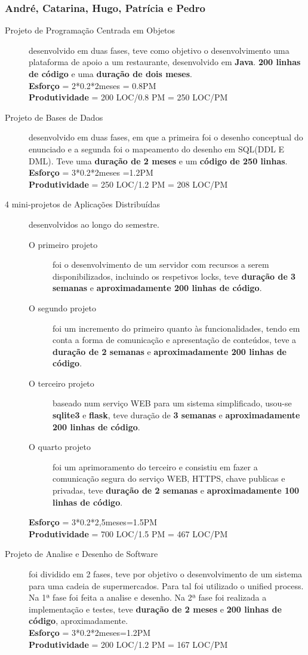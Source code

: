\documentclass[a4paper]{report}
\begin{document}
\subsubsection*{André, Catarina, Hugo, Patrícia e Pedro} 
\begin{description}
    \item[Projeto de Programação Centrada em Objetos] desenvolvido em duas fases, teve como objetivo o desenvolvimento uma plataforma de apoio a um restaurante, desenvolvido em \textbf{Java}. \textbf{200 linhas de código} e uma \textbf{duração de dois meses}.\\\textbf{Esforço} = 2*0.2*2meses = 0.8PM\\ \textbf{Produtividade} = 200 LOC/0.8 PM = 250 LOC/PM
    
    \item[Projeto de Bases de Dados] desenvolvido em duas fases, em que a primeira foi o desenho conceptual do enunciado e a segunda foi o mapeamento do desenho em SQL(DDL E DML). Teve uma \textbf{duração de 2 meses} e um \textbf{código de 250 linhas}.\\\textbf{Esforço} = 3*0.2*2meses =1.2PM\\ \textbf{Produtividade} = 250 LOC/1.2 PM = 208 LOC/PM
    \item[4 mini-projetos de Aplicações Distribuídas] desenvolvidos ao longo do semestre.
    \begin{description}
    	\item[O primeiro projeto] foi o desenvolvimento de um servidor com recursos a serem disponibilizados, incluindo os respetivos locks, teve  \textbf{duração de 3 semanas} e \textbf{aproximadamente 200 linhas de código}.
    	\item[O segundo projeto] foi um incremento do primeiro quanto às funcionalidades, tendo em conta a forma de comunicação e apresentação de conteúdos, teve a \textbf{duração de 2 semanas} e \textbf{aproximadamente 200 linhas de código}.
    	\item[O terceiro projeto] baseado num serviço WEB para um sistema simplificado, usou-se \textbf{sqlite3} e \textbf{flask}, teve duração de \textbf{3 semanas} e \textbf{aproximadamente 200 linhas de código}.
    	\item[O quarto projeto] foi um aprimoramento do terceiro e consistiu em fazer a comunicação segura do serviço WEB, HTTPS, chave publicas e privadas, teve \textbf{duração de 2 semanas} e \textbf{aproximadamente 100 linhas de código}.
    \end{description}\mbox{}\textbf{Esforço} = 3*0.2*2,5meses=1.5PM\\ \textbf{Produtividade} = 700 LOC/1.5 PM = 467 LOC/PM
    \item[Projeto de Analise e Desenho de Software] foi dividido em 2 fases, teve por objetivo o desenvolvimento de um sistema para uma cadeia de supermercados. Para tal foi utilizado o unified process. Na 1ª fase foi feita a analise e desenho. Na 2ª fase foi realizada a  implementação e testes, teve \textbf{duração de 2 meses} e \textbf{200 linhas de código}, aproximadamente.\\\textbf{Esforço} = 3*0.2*2meses=1.2PM\\ \textbf{Produtividade} = 200 LOC/1.2 PM = 167 LOC/PM
    

\end{description}
\end{document}
